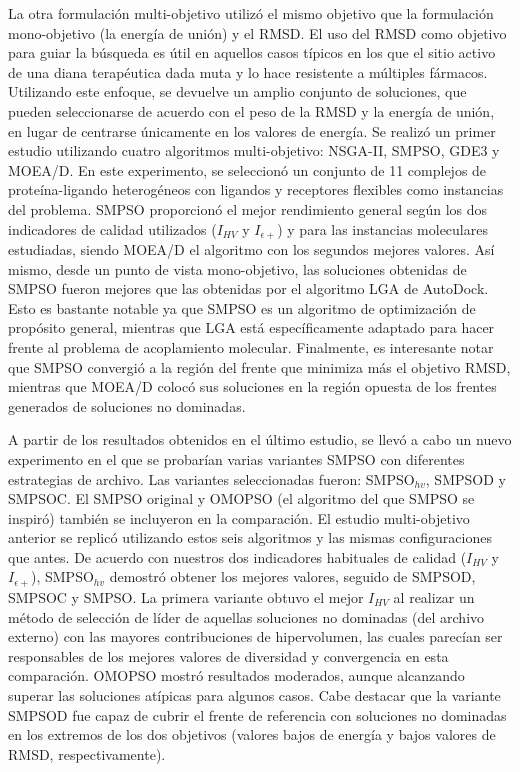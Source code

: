 La otra formulación multi-objetivo utilizó el mismo objetivo que la formulación mono-objetivo (la energía de unión) y el RMSD. El uso del RMSD como objetivo para guiar la búsqueda es útil en aquellos casos típicos en los que el sitio activo de una diana terapéutica dada muta y lo hace resistente a múltiples fármacos. Utilizando este enfoque, se devuelve un amplio conjunto de soluciones, que pueden seleccionarse de acuerdo con el peso de la RMSD y la energía de unión, en lugar de centrarse únicamente en los valores de energía. Se realizó un primer estudio utilizando cuatro algoritmos multi-objetivo: NSGA-II, SMPSO, GDE3 y MOEA/D. En este experimento, se seleccionó un conjunto de 11 complejos de proteína-ligando heterogéneos con ligandos y receptores flexibles como instancias del problema. SMPSO proporcionó el mejor rendimiento general según los dos indicadores de calidad utilizados ($I_{HV}$ y $I_{\epsilon+}$) y para las instancias moleculares estudiadas, siendo MOEA/D el algoritmo con los segundos mejores valores. Así mismo, desde un punto de vista mono-objetivo, las soluciones obtenidas de SMPSO fueron mejores que las obtenidas por el algoritmo LGA de AutoDock. Esto es bastante notable ya que SMPSO es un algoritmo de optimización de propósito general, mientras que LGA está específicamente adaptado para hacer frente al problema de acoplamiento molecular. Finalmente, es interesante notar que SMPSO convergió a la región del frente que minimiza más el objetivo RMSD, mientras que MOEA/D colocó sus soluciones en la región opuesta de los frentes generados de soluciones no dominadas.

A partir de los resultados obtenidos en el último estudio, se llevó a cabo un nuevo experimento en el que se probarían varias variantes SMPSO con diferentes estrategias de archivo. Las variantes seleccionadas fueron: SMPSO$_{hv}$, SMPSOD y SMPSOC. El SMPSO original y OMOPSO (el algoritmo del que SMPSO se inspiró) también se incluyeron en la comparación. El estudio multi-objetivo anterior se replicó utilizando estos seis algoritmos y las mismas configuraciones que antes. De acuerdo con nuestros dos indicadores habituales de calidad ($I_{HV}$ y $I_{\epsilon+}$), SMPSO$_{hv}$ demostró obtener los mejores valores, seguido de SMPSOD, SMPSOC y SMPSO. La primera variante obtuvo el mejor $I_{HV}$ al realizar un método de selección de líder de aquellas soluciones no dominadas (del archivo externo) con las mayores contribuciones de hipervolumen, las cuales parecían ser responsables de los mejores valores de diversidad y convergencia en esta comparación. OMOPSO mostró resultados moderados, aunque alcanzando superar las soluciones atípicas para algunos casos. Cabe destacar que la variante SMPSOD fue capaz de cubrir el frente de referencia con soluciones no dominadas en los extremos de los dos objetivos (valores bajos de energía y bajos valores de RMSD, respectivamente).

